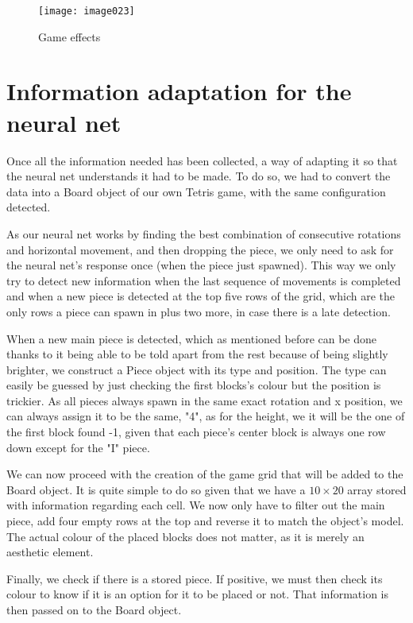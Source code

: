 \begin{figure}[h]
\centering
\texttt{[image: image023]}
\caption{\label{effects}Game effects}
\end{figure}

\section{Information adaptation for the neural net}
Once all the information needed has been collected, a way of adapting it so that the neural net understands it had to be made. To do so, we had to convert the data into a Board object of our own Tetris game, with the same configuration detected.

As our neural net works by finding the best combination of consecutive rotations and horizontal movement, and then dropping the piece, we only need to ask for the neural net’s response once (when the piece just spawned). This way we only try to detect new information when the last sequence of movements is completed and when a new piece is detected at the top five rows of the grid, which are the only rows a piece can spawn in plus two more, in case there is a late detection.

When a new main piece is detected, which as mentioned before can be done thanks to it being able to be told apart from the rest because of being slightly brighter, we construct a Piece object with its type and position. The type can easily be guessed by just checking the first blocks's colour but the position is trickier. As all pieces always spawn in the same exact rotation and x position, we can always assign it to be the same, "4", as for the height, we it will be the one of the first block found -1, given that each piece's center block is always one row down except for the "I" piece.

We can now proceed with the creation of the game grid that will be added to the Board object. It is quite simple to do so given that we have a $10\times 20$ array stored with information regarding each cell. We now only have to filter out the main piece, add four empty rows at the top and reverse it to match the object’s model. The actual colour of the placed blocks does not matter, as it is merely an aesthetic element.

Finally, we check if there is a stored piece. If positive, we must then check its colour to know if it is an option for it to be placed or not. That information is then passed on to the Board object.

